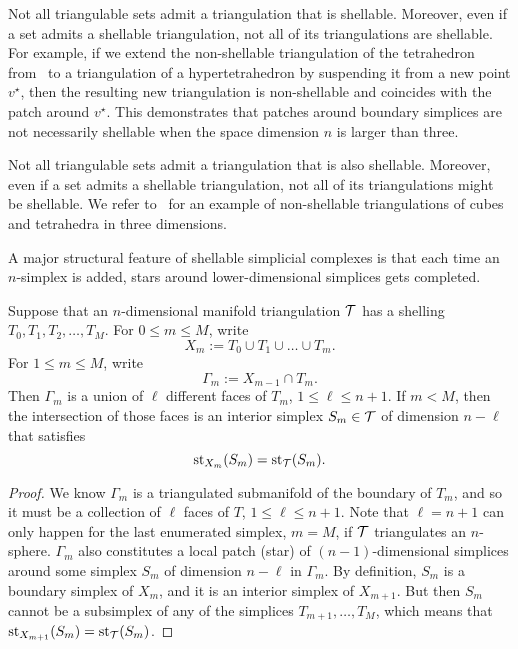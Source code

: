\documentclass[10pt,a4paper]{article}
\begin{document}
\begin{remark}
    Not all triangulable sets admit a triangulation that is shellable. 
    Moreover, even if a set admits a shellable triangulation, not all of its triangulations are shellable. For example, if we extend the non-shellable triangulation of the tetrahedron from~\cite[Example 8.9]{ziegler1995lectures} to a triangulation of a hypertetrahedron by suspending it from a new point $v^\star$, then the resulting new triangulation is non-shellable and coincides with the patch around $v^\star$.
    This demonstrates that patches around boundary simplices are not necessarily shellable when the space dimension $n$ is larger than three.
\end{remark}
\begin{remark}
    Not all triangulable sets admit a triangulation that is also shellable. 
    Moreover, even if a set admits a shellable triangulation, not all of its triangulations might be shellable. 
    We refer to~\cite[Example 8.9]{ziegler1995lectures} for an example of non-shellable triangulations of cubes and tetrahedra in three dimensions. 
\end{remark}


A major structural feature of shellable simplicial complexes is that each time an $n$-simplex is added, stars around lower-dimensional simplices gets completed. 

\begin{lemma}\label{lemma:existenceofstar}
    Suppose that an $n$-dimensional manifold triangulation ${\mathcal T}$ has a shelling $T_{0}, T_{1}, T_{2}, \dots, T_{M}$.
    For $0 \leq m \leq M$, write 
    $$
        X_{m} := T_{0} \cup T_{1} \cup \dots \cup T_{m}.
    $$ 
    For $1 \leq m \leq M$, write 
    $$
        \Gamma_{m} := X_{m-1} \cap T_{m}.
    $$ 
    Then $\Gamma_{m}$ is a union of $\ell$ different faces of $T_{m}$, $1 \leq \ell \leq n+1$.
    If $m < M$, then the intersection of those faces is an interior simplex $S_{m} \in {\mathcal T}$ of dimension $n-\ell$ that satisfies 
    $$
        \operatorname{st}_{X_{m}}(S_{m}) = \operatorname{st}_{{\mathcal T}}(S_{m}).
    $$
\end{lemma}
\begin{proof}
    We know $\Gamma_{m}$ is a triangulated submanifold of the boundary of $T_{m}$, 
    and so it must be a collection of $\ell$ faces of $T$, $1 \leq \ell \leq n+1$.
    Note that $\ell = n + 1$ can only happen for the last enumerated simplex, $m = M$, if ${\mathcal T}$ triangulates an $n$-sphere. 
    $\Gamma_{m}$ also constitutes a local patch (star) of $(n-1)$-dimensional simplices around some simplex $S_{m}$ of dimension $n-\ell$ in $\Gamma_{m}$.
    By definition, $S_{m}$ is a boundary simplex of $X_{m}$, 
    and it is an interior simplex of $X_{m+1}$. 
    But then $S_{m}$ cannot be a subsimplex of any of the simplices $T_{m+1}, \dots, T_{M}$,
    which means that $\operatorname{st}_{X_{m+1}}(S_{m}) = \operatorname{st}_{{\mathcal T}}(S_{m})$. 
\end{proof}
\end{document}
